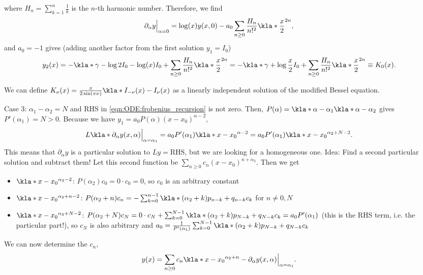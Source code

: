 \documentclass[english, parskip=full]{scrbook}
\newcommand{\note}[1]{\begin{tcolorbox}[colback=colorbackgroundnote,colframe=colornote, breakable,enhanced]#1\end{tcolorbox}}
\begin{document}
where $H_n=\sum_{k=1}^n \frac{1}{k}$ is the $n$-th harmonic number.
Therefore, we find
\begin{align}
\partial_\alpha y\Big\vert_{\alpha=0} &= \log(x)y(x,0) - a_0\sum_{n\ge 0} \frac{H_n}{n!^2} \kla*{\frac{x}{2}}^{2n},
\end{align}
and $a_0=-1$ gives (adding another factor from the first solution $y_1=I_0$)
\begin{align}
y_2(x) &= -\kla*{\gamma - \log 2}I_0 - \log(x)I_0 + \sum_{n\ge 0} \frac{H_n}{n!^2} \kla*{\frac{x}{2}}^{2n} = -\kla*{\gamma + \log \frac{x}{2}}I_0 + \sum_{n\ge 0} \frac{H_n}{n!^2} \kla*{\frac{x}{2}}^{2n} \equiv K_0(x).
\end{align}
\note{We can define $K_\nu(x) = \frac{\pi}{2\sin(\pi\nu)} \kla*{I_{-\nu}(x) - I_\nu(x)}$ as a linearly independent solution of the modified Bessel equation.}
Case 3: $\alpha_1-\alpha_2=N$ and RHS in \autoref{eqn:ODE:frobenius_recursion} is not zero.
Then, $P(\alpha)=\kla*{\alpha-\alpha_1}\kla*{\alpha-\alpha_2}$ gives $P'(\alpha_1)=N>0$. 
Because we have $y_1=a_0P(\alpha)(x-x_0)^{\alpha-2}$,
\begin{align}
L\kla*{\partial_\alpha y(x,\alpha) \Big\vert_{\alpha=\alpha_1}} &= a_0 P'(\alpha_1) \kla*{x-x_0}^{\alpha-2} = a_0 P'(\alpha_1) \kla*{x-x_0}^{\alpha_2+N-2}.
\end{align}
This means that $\partial_\alpha y$ is a particular solution to $Ly=\text{RHS}$, but we are looking for a homogeneous one.
Idea: Find a second particular solution and subtract them!
Let this second function be $\sum_{n\ge 0} c_n(x-x_0)^{n+\alpha_2}$.
Then we get
\begin{itemize}
\item $\kla*{x-x_0}^{\alpha_2-2}$: $P(\alpha_2)c_0 = 0\cdot c_0 = 0$, so $c_0$ is an arbitrary constant
\item $\kla*{x-x_0}^{\alpha_2+n-2}$: $P(\alpha_2+n)c_n = -\sum_{k=0}^{n-1} \kla*{(\alpha_2+k) p_{n-k} + q_{n-k}}c_k$ for $n\neq 0,N$
\item $\kla*{x-x_0}^{\alpha_2+N-2}$: $P(\alpha_2+N)c_N = 0\cdot c_N + \sum_{k=0}^{N-1} \kla*{(\alpha_2+k) p_{N-k} + q_{N-k}}c_k = a_0P'(\alpha_1)$ (this is the RHS term, i.e. the particular part!), so $c_N$ is also arbitrary and $a_0 = \frac{1}{P'(\alpha_1)} \sum_{k=0}^{N-1} \kla*{(\alpha_2+k)p_{N-k} + q_{N-k}}c_k$
\end{itemize}
We can now determine the $c_n$,
\begin{align}
y(x) &= \sum_{n\ge 0} c_n \kla*{x-x_0}^{\alpha_2+n} - \partial_\alpha y(x,\alpha)\Big\vert_{\alpha=\alpha_1}.
\end{align}
\end{document}
